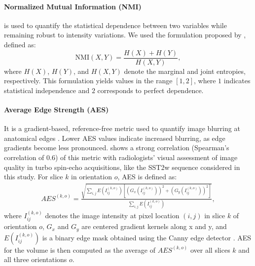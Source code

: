 \documentclass[preprint,authoryear,12pt]{elsarticle}
\begin{document}
\paragraph{Normalized Mutual Information (NMI)} is used to quantify the statistical dependence between two variables while remaining robust to intensity variations. We used the formulation proposed by \citet{studholme_1999_overlap}, defined as:
\[
\mathrm{NMI}(X,Y) = \frac{H(X) + H(Y)}{H(X,Y)},
\]
where $H(X)$, $H(Y)$, and $H(X,Y)$ denote the marginal and joint entropies, respectively. This formulation yields values in the range $[1,2]$, where $1$ indicates statistical independence and $2$ corresponds to perfect dependence.




\paragraph{Average Edge Strength (AES)}It is a gradient-based, reference-free metric used to quantify image blurring at anatomical edges \citep{pannetier_quantitative_2016}. Lower AES values indicate increased blurring, as edge gradients become less pronounced. \cite{eichhorn_evaluating_nodate} shows a strong correlation (Spearman's correlation of 0.6) of this metric with radiologists' visual assessment of image quality in turbo spin-echo acquisitions, like the SST2w sequence considered in this study. %
For slice $k$ in orientation $o$, AES is defined as:
\begin{align*}
AES^{(k,o)} =
\frac{
\sqrt{
\sum_{i,j} E\left(I_{ij}^{(k,o)}\right)
\left[
\left(G_x\left(I_{ij}^{(k,o)}\right)\right)^2 +
\left(G_y\left(I_{ij}^{(k,o)}\right)\right)^2
\right]
}
}{
\sum_{i,j} E\left(I_{ij}^{(k,o)}\right)
},
\end{align*}
where $I_{ij}^{(k,o)}$ denotes the image intensity at pixel location $(i,j)$ in slice $k$ of orientation $o$, $G_x$ and $G_y$ are centered gradient kernels along x and y, and $E\left(I_{ij}^{(k,o)}\right)$ is a binary edge mask obtained using the Canny edge detector \citep{canny_computational_1986}. AES for the volume is then computed as the average of $AES^{(k,o)}$ over all slices $k$ and all three orientations $o$. 
\end{document}
